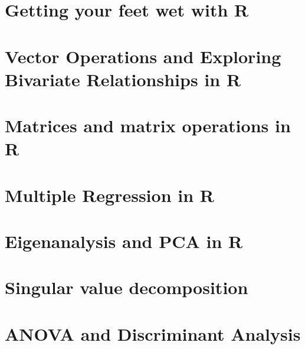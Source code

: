 \documentclass[10pt,oneside,bigheadings,tablecaptionabove]{scrbook}
\begin{document}


\clearscrheadfoot
\pagestyle{scrheadings}

\titleLL
\clearpage
{}


\tableofcontents
\clearpage


\clearscrheadfoot
{}
\ihead{\tikzhead\headmark}
\ohead{\pagemark}
\pagestyle{scrheadings}
\renewcommand*{\chapterpagestyle}{scrheadings}


\chapter{Getting your feet wet with R}


\chapter{Vector Operations and Exploring Bivariate Relationships in R}


\chapter{Matrices and matrix operations in R}


\chapter{Multiple Regression in R}



\chapter{Eigenanalysis and PCA in R}


\chapter{Singular value decomposition}


\chapter{ANOVA and Discriminant Analysis}

\end{document}
